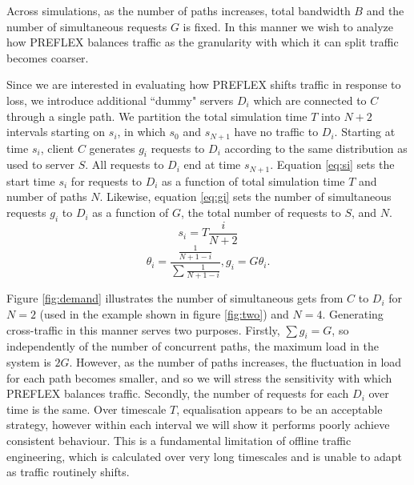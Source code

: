 Across simulations, as the number of paths increases, total bandwidth $B$ and the number of simultaneous requests $G$ is fixed. 
In this manner we wish to analyze how \ac{PREFLEX} balances traffic as the granularity with which it can split traffic becomes coarser.

Since we are interested in evaluating how \ac{PREFLEX} shifts traffic in response to loss, we introduce additional ``dummy" servers $D_i$ which are connected to $C$ through a single path. 
We partition the total simulation time $T$ into $N+2$ intervals starting on $s_i$, in which $s_0$ and $s_{N+1}$ have no traffic to $D_i$. 
Starting at time $s_i$, client $C$ generates $g_i$ requests to $D_i$ according to the same distribution as used to server $S$. 
All requests to $D_i$ end at time $s_{N+1}$. 
Equation \eqref{eq:si} sets the start time $s_i$ for requests to $D_i$ as a function of total simulation time $T$ and number of paths $N$. 
Likewise, equation \eqref{eq:gi} sets the number of simultaneous requests $g_i$ to $D_i$ as a function of $G$, the total number of requests to $S$, and $N$.
\begin{equation}
s_i = T\frac{i}{N+2}
\label{eq:si}
\end{equation}
\begin{equation}
\theta_i = \frac{\frac{1}{N+1-i}}{\sum{\frac{1}{N+1-i}}},  g_i = G\theta_i.
\label{eq:gi}
\end{equation}

Figure \ref{fig:demand} illustrates the number of simultaneous gets from $C$ to $D_i$ for $N=2$ (used in the example shown in figure \ref{fig:two}) and $N=4$. 
Generating cross-traffic in this manner serves two purposes. 
Firstly, $\sum{g_i}=G$, so independently of the number of concurrent paths, the maximum load in the system is $2G$. 
However, as the number of paths increases, the fluctuation in load for each path becomes smaller, and so we will stress the sensitivity with which \ac{PREFLEX} balances traffic. 
Secondly, the number of requests for each $D_i$ over time is the same. 
Over timescale $T$, equalisation appears to be an acceptable strategy, however within each interval we will show it performs poorly achieve consistent behaviour. 
This is a fundamental limitation of offline traffic engineering, which is calculated over very long timescales and is unable to adapt as traffic routinely shifts.


